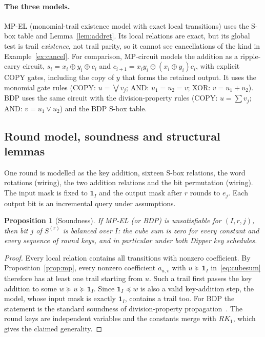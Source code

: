 \documentclass[11pt,a4paper]{article}
\newtheorem{proposition}{Proposition}
\theoremstyle{definition}
\theoremstyle{remark}
\newcommand{\MPEL}{\textsf{MP-EL}}
\newcommand{\MPC}{\textsf{MP-circuit}}
\newcommand{\BDP}{\textsf{BDP}}
\begin{document}
\paragraph{The three models.} \MPEL{} (monomial-trail existence model with exact local transitions) uses the S-box table and Lemma~\ref{lem:addret}. Its local relations are exact, but its global test is trail \emph{existence}, not trail parity, so it cannot see cancellations of the kind in Example~\ref{ex:cancel}. For comparison, \MPC{} models the addition as a ripple-carry circuit, $s_i=x_i\oplus y_i\oplus c_i$ and $c_{i+1}=x_iy_i\oplus(x_i\oplus y_i)c_i$, with explicit COPY gates, including the copy of $y$ that forms the retained output. It uses the monomial gate rules (COPY: $u=\bigvee v_j$; AND: $u_1=u_2=v$; XOR: $v=u_1+u_2$). \BDP{} uses the same circuit with the division-property rules (COPY: $u=\sum v_j$; AND: $v=u_1\vee u_2$) and the BDP S-box table.

\subsection{Round model, soundness and structural lemmas}
One round is modelled as the key addition, sixteen S-box relations, the word rotations (wiring), the two addition relations and the bit permutation (wiring). The input mask is fixed to $\mathbf 1_I$ and the output mask after $r$ rounds to $e_j$. Each output bit is an incremental query under assumptions.

\begin{proposition}[Soundness]\label{prop:sound}
If \MPEL{} (or \BDP) is unsatisfiable for $(I,r,j)$, then bit $j$ of $S^{(r)}$ is balanced over $I$: the cube sum is zero for every constant and every sequence of round keys, and in particular under both Dipper key schedules.
\end{proposition}
\begin{proof}
Every local relation contains all transitions with nonzero coefficient. By Proposition~\ref{prop:mp}, every nonzero coefficient $a_{u,v}$ with $u\succeq\mathbf 1_I$ in~\eqref{eq:cubesum} therefore has at least one trail starting from $u$. Such a trail first passes the key addition to some $w\succeq u\succeq\mathbf 1_I$. Since $\mathbf 1_I\preceq w$ is also a valid key-addition step, the model, whose input mask is exactly $\mathbf 1_I$, contains a trail too. For \BDP{} the statement is the standard soundness of division-property propagation~\cite{todo2016bit,xiang2016milp}. The round keys are independent variables and the constants merge with $RK_1$, which gives the claimed generality.
\end{proof}
\end{document}
